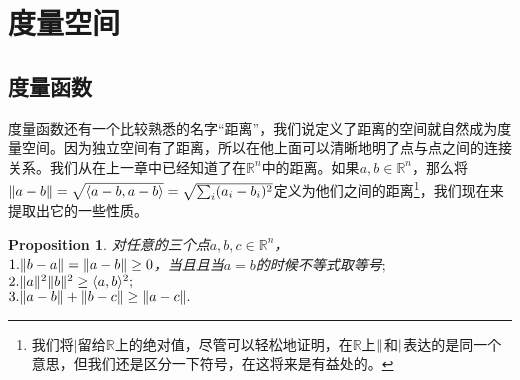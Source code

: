 \documentclass[11pt,a4paper,openany]{book}%
\theoremstyle{plain}%
\newtheorem{pro}{Proposition}[chapter]%
\begin{document}
\section{度量空间}
\subsection{度量函数}
度量函数还有一个比较熟悉的名字“距离”，我们说定义了距离的空间就自然成为度量空间。因为独立空间有了距离，所以在他上面可以清晰地明了点与点之间的连接关系。我们从在上一章中已经知道了在$\mathbb{R}^n$中的距离。如果$a,b \in \mathbb{R}^n$，那么将$\Arrowvert a-b \Arrowvert=\sqrt{\langle a-b,a-b\rangle}=\sqrt{\sum_i (a_i-b_i)^2}$定义为他们之间的距离\footnote{我们将$|$留给$\mathbb{R}$上的绝对值，尽管可以轻松地证明，在$\mathbb{R}$上$\Arrowvert$和$\arrowvert$表达的是同一个意思，但我们还是区分一下符号，在这将来是有益处的。}，我们现在来提取出它的一些性质。
\begin{pro}对任意的三个点$a,b,c \in \mathbb{R}^n$，\\
$1.\Arrowvert b-a\Arrowvert =\Arrowvert a-b\Arrowvert \geq0 $，当且且当$a=b$的时候不等式取等号$;$\\
$2.\Arrowvert a\Arrowvert ^2\Arrowvert b\Arrowvert ^2\geq \langle a, b \rangle^2;$\\
$3.\Arrowvert a-b\Arrowvert +\Arrowvert b-c\Arrowvert \geq \Arrowvert a-c\Arrowvert .$
\end{pro}
\end{document}
